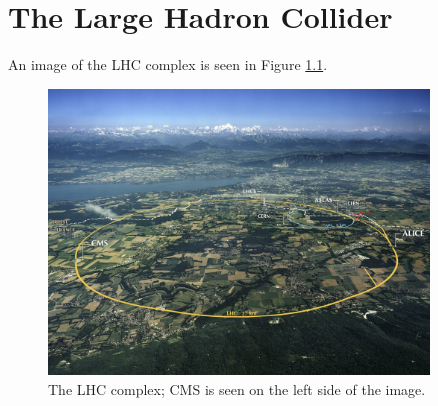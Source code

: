 \chapter{The Large Hadron Collider}
\label{chap:lhc}

An image of the LHC complex is seen in Figure \ref{fig:lhc}.

\begin{figure}[htbp]
\centering
\includegraphics[width=0.9\textwidth]{figs/lhc.jpg}
\caption{The LHC complex; CMS is seen on the left side of the image.}
\label{fig:lhc}
\end{figure}

